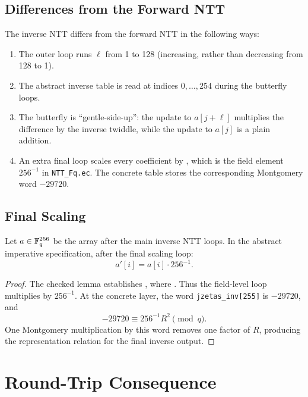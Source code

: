\subsection{Differences from the Forward NTT}

The inverse NTT differs from the forward NTT in the following ways:
\begin{enumerate}
  \item The outer loop runs $\ell$ from 1 to 128 (increasing, rather than
        decreasing from 128 to 1).
  \item The abstract inverse table is read at indices $0,\dots,254$ during
        the butterfly loops.
  \item The butterfly is ``gentle-side-up'': the update to $a[j+\ell]$
        multiplies the difference by the inverse twiddle, while the update
        to $a[j]$ is a plain addition.
  \item An extra final loop scales every coefficient by
        , which is the field element $256^{-1}$ in
        \texttt{NTT\_Fq.ec}.  The concrete \jasmin{} table stores the
        corresponding Montgomery word $-29720$.
\end{enumerate}

\subsection{Final Scaling}

\begin{lemma}
  Let $a \in \mathbb{F}_q^{256}$ be the array after the main inverse NTT loops.
  In the abstract imperative specification, after the final scaling loop:
  \[
    a'[i] = a[i] \cdot 256^{-1}.
  \]
\label{lem:final_scale}
\end{lemma}

\begin{proof}
  The checked lemma  establishes
  , where
  .  Thus the field-level loop multiplies
  by $256^{-1}$.  At the concrete \jasmin{} layer, the word
  \texttt{jzetas\_inv[255]} is $-29720$, and
  \[
    -29720 \equiv 256^{-1} R^2 \pmod q.
  \]
  One Montgomery multiplication by this word removes one factor of $R$,
  producing the representation relation
   for the final inverse output.
\end{proof}

\section{Round-Trip Consequence}

